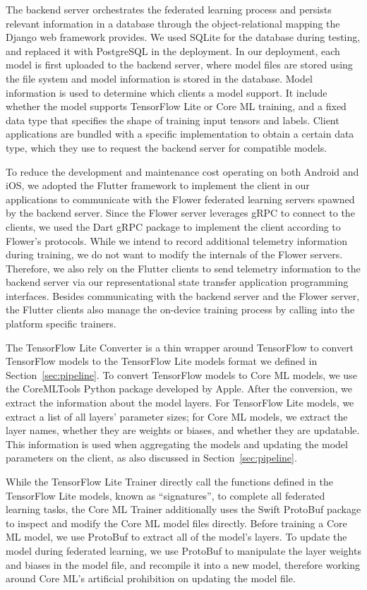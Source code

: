 The backend server orchestrates the federated learning process and persists
relevant information in a database through the object-relational mapping the
Django web framework provides. We used SQLite for the database during testing,
and replaced it with PostgreSQL in the deployment. In our deployment,
each model is first uploaded to the backend server,
where model files are stored using the file system and model information is
stored in the database.
Model information is used to determine which clients a model support.
It include whether the model supports TensorFlow Lite or Core ML training,
and a fixed data type that specifies the shape of training input tensors and
labels.
Client applications are bundled with a specific implementation to obtain a
certain data type,
which they use to request the backend server for compatible models.

To reduce the development and maintenance cost operating on both Android and
iOS,
we adopted the Flutter framework to implement the client in our applications to
communicate with the Flower federated learning servers spawned by the backend
server. Since the Flower server leverages gRPC to connect to the clients,
we used the Dart gRPC package to implement the client according to Flower's
protocols.
While we intend to record additional telemetry information during training,
we do not want to modify the internals of the Flower servers. Therefore,
we also rely on the Flutter clients to send telemetry information to the backend
server via our representational state transfer application programming
interfaces.
Besides communicating with the backend server and the Flower server,
the Flutter clients also manage the on-device training process by calling into
the platform specific trainers. %

The TensorFlow Lite Converter is a thin wrapper around TensorFlow to convert
TensorFlow models to the TensorFlow Lite models format we defined in
Section~\ref{sec:pipeline}.
To convert TensorFlow models to Core ML models,
we use the CoreMLTools Python package developed by Apple. After the conversion,
we extract the information about the model layers. For TensorFlow Lite models,
we extract a list of all layers' parameter sizes; for Core ML models,
we extract the layer names, whether they are weights or biases,
and whether they are updatable.
This information is used when aggregating the models and updating the model
parameters on the client, as also discussed in Section~\ref{sec:pipeline}.

While the TensorFlow Lite Trainer directly call the functions defined in the
TensorFlow Lite models, known as ``signatures'',
to complete all federated learning tasks,
the Core ML Trainer additionally uses the Swift ProtoBuf package to inspect and
modify the Core ML model files directly.
Before training a Core ML model,
we use ProtoBuf to extract all of the model's layers.
To update the model during federated learning,
we use ProtoBuf to manipulate the layer weights and biases in the model file,
and recompile it into a new model,
therefore working around Core ML's artificial prohibition on updating the model
file.
